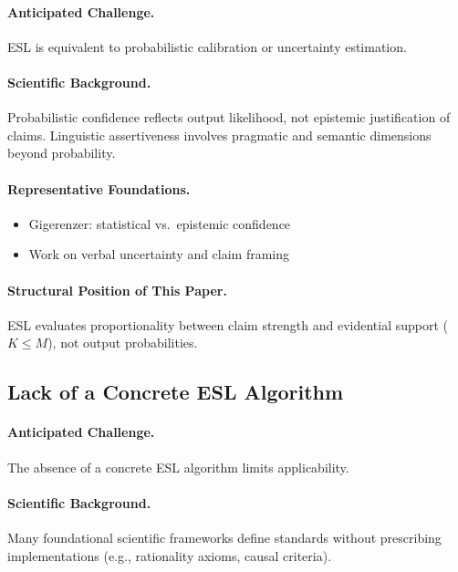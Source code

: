 \paragraph{Anticipated Challenge.}
ESL is equivalent to probabilistic calibration or uncertainty estimation.

\paragraph{Scientific Background.}
Probabilistic confidence reflects output likelihood, not epistemic justification of claims. Linguistic assertiveness involves pragmatic and semantic dimensions beyond probability.

\paragraph{Representative Foundations.}
\begin{itemize}
    \item Gigerenzer: statistical vs.\ epistemic confidence
    \item Work on verbal uncertainty and claim framing
\end{itemize}

\paragraph{Structural Position of This Paper.}
ESL evaluates proportionality between claim strength and evidential support ($K \le M$), not output probabilities.


\subsection{Lack of a Concrete ESL Algorithm}

\paragraph{Anticipated Challenge.}
The absence of a concrete ESL algorithm limits applicability.

\paragraph{Scientific Background.}
Many foundational scientific frameworks define standards without prescribing implementations (e.g., rationality axioms, causal criteria).

